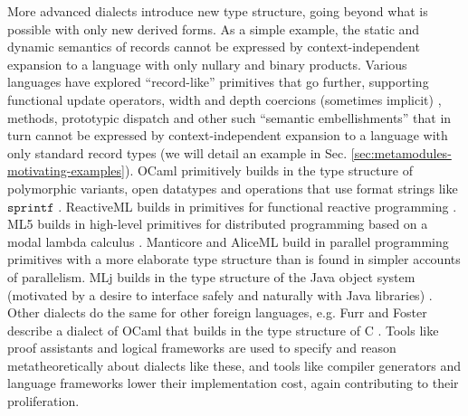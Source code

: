 More advanced dialects introduce new type structure, going beyond what is possible with only new derived forms. As a simple example, the static and dynamic semantics of records cannot be expressed by context-independent expansion to a language with only nullary and binary products. Various languages have explored ``record-like'' primitives that go further, supporting functional update operators, width and depth coercions (sometimes implicit)%
, methods, prototypic dispatch and other such ``semantic embellishments'' that in turn cannot be expressed by context-independent expansion to a language with only standard record types (we will detail an  example in Sec. \ref{sec:metamodules-motivating-examples}). OCaml primitively builds in the type structure of polymorphic variants, open datatypes and  operations that use format strings like $\mathtt{sprintf}$ \cite{ocaml-manual}. ReactiveML builds in primitives for functional reactive programming \cite{mandel2005reactiveml}. ML5 builds in high-level primitives for distributed programming based on a modal lambda calculus \cite{Murphy:2007:TDP:1793574.1793585}. Manticore \cite{conf/popl/FluetRRSX07} and AliceML  \cite{AliceLookingGlass} build in parallel programming primitives with a more elaborate type structure than is found in simpler accounts of parallelism. 
MLj builds in the type structure of the Java object system (motivated by a desire to interface safely and naturally with Java libraries) \cite{Benton:1999:IWW:317636.317791}. Other dialects do the same for other foreign languages, e.g. Furr and Foster describe a dialect of OCaml that builds in the type structure of C \cite{Furr:2005:CTS:1065010.1065019}. Tools like proof assistants and logical frameworks are used to specify and reason metatheoretically about dialects like these, and tools like compiler generators and language frameworks \cite{erdweg2013state} lower their implementation cost, again contributing to their proliferation. 

